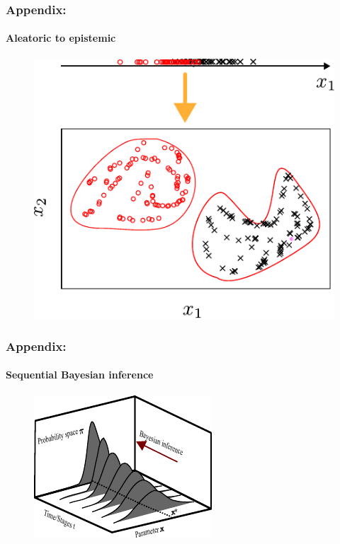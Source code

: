 \backupbegin

\begin{frame}
\frametitle{Appendix:}
\framesubtitle{Aleatoric to epistemic}
\begin{figure}[!ht]       \includegraphics[scale=1]{figures/figure-transform.pdf}
\end{figure}
    
\end{frame}
\begin{frame}
\frametitle{Appendix:}
\framesubtitle{Sequential Bayesian inference}
\begin{figure}[!ht]       \includegraphics[scale=2.55]{figures/figure-SBI.pdf}
\end{figure}
    
\end{frame}


